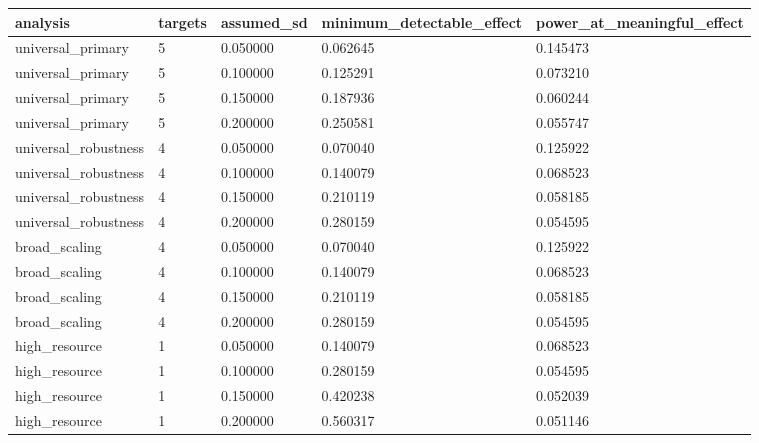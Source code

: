 \begin{tabular}{lllll}
\toprule
analysis & targets & assumed\_sd & minimum\_detectable\_effect & power\_at\_meaningful\_effect \\
\midrule
universal\_primary & 5 & 0.050000 & 0.062645 & 0.145473 \\
universal\_primary & 5 & 0.100000 & 0.125291 & 0.073210 \\
universal\_primary & 5 & 0.150000 & 0.187936 & 0.060244 \\
universal\_primary & 5 & 0.200000 & 0.250581 & 0.055747 \\
universal\_robustness & 4 & 0.050000 & 0.070040 & 0.125922 \\
universal\_robustness & 4 & 0.100000 & 0.140079 & 0.068523 \\
universal\_robustness & 4 & 0.150000 & 0.210119 & 0.058185 \\
universal\_robustness & 4 & 0.200000 & 0.280159 & 0.054595 \\
broad\_scaling & 4 & 0.050000 & 0.070040 & 0.125922 \\
broad\_scaling & 4 & 0.100000 & 0.140079 & 0.068523 \\
broad\_scaling & 4 & 0.150000 & 0.210119 & 0.058185 \\
broad\_scaling & 4 & 0.200000 & 0.280159 & 0.054595 \\
high\_resource & 1 & 0.050000 & 0.140079 & 0.068523 \\
high\_resource & 1 & 0.100000 & 0.280159 & 0.054595 \\
high\_resource & 1 & 0.150000 & 0.420238 & 0.052039 \\
high\_resource & 1 & 0.200000 & 0.560317 & 0.051146 \\
\bottomrule
\end{tabular}
